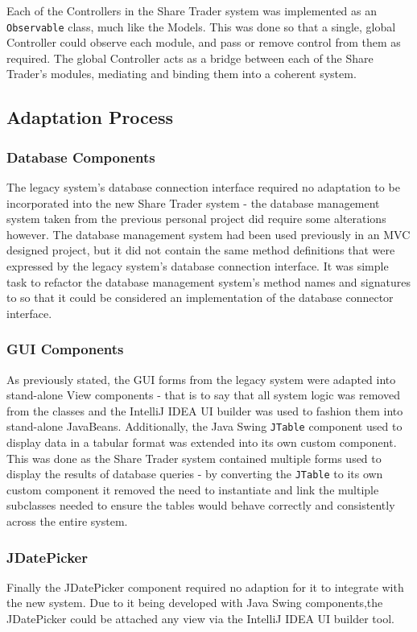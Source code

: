 \documentclass[12pt, a4paper,titlepage]{article}
\begin{document}
Each of the Controllers in the Share Trader system was implemented as an
{\tt Observable} class, much like the Models. 
This was done so that a single, global Controller could observe each module,
and pass or remove control from them as required. 
The global Controller acts as a bridge between each of the Share Trader's
modules, mediating and binding them into a coherent system.

\subsection{Adaptation Process}
\subsubsection{Database Components}
The legacy system's database connection interface required no adaptation to be
incorporated into the new Share Trader system - the database management system
taken from the previous personal project did require some alterations however.
The database management system had been used previously in an MVC designed
project, but it did not contain the same method definitions that were
expressed by the legacy system’s database connection interface. 
It was simple task to refactor the database management system's method names
and signatures to so that it could be considered an implementation of the
database connector interface.

\subsubsection{GUI Components}
As previously stated, the GUI forms from the legacy system were adapted into
stand-alone View components - that is to say that all system logic was removed
from the classes and the IntelliJ IDEA UI builder was used to fashion them into
stand-alone JavaBeans.
Additionally, the  Java Swing {\tt JTable} component used to display data in a
tabular format was extended into its own custom component.  
This was done as the Share Trader system contained multiple forms used to
display the results of database queries - by converting the {\tt JTable} to
its own custom component it removed the need to instantiate and link the
multiple subclasses needed to ensure the tables would behave correctly and
consistently across the entire system.

\subsubsection{JDatePicker}
Finally the JDatePicker component required no adaption for it to integrate
with the new system. 
Due to it being developed with Java Swing components,the JDatePicker could be
attached any view via the IntelliJ IDEA UI builder tool.
\end{document}
